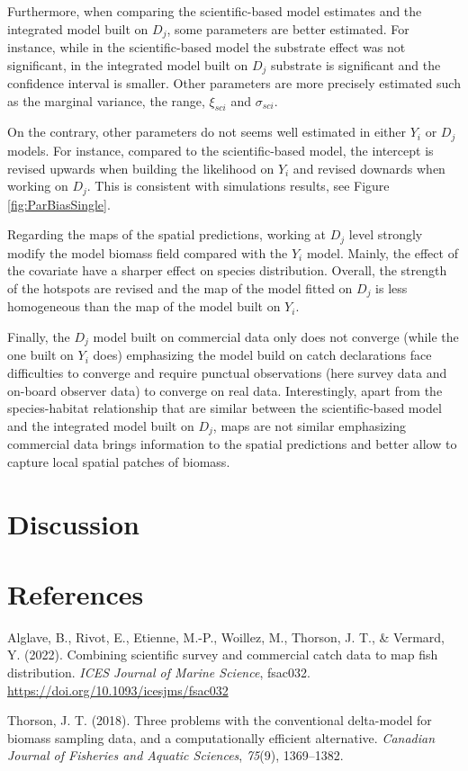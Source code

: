 \documentclass[
  english,
  man]{apa6}
\begin{document}
Furthermore, when comparing the scientific-based model estimates and the integrated model built on \(D_j\), some parameters are better estimated. For instance, while in the scientific-based model the substrate effect was not significant, in the integrated model built on \(D_j\) substrate is significant and the confidence interval is smaller. Other parameters are more precisely estimated such as the marginal variance, the range, \(\xi_{sci}\) and \(\sigma_{sci}\).

On the contrary, other parameters do not seems well estimated in either \(Y_i\) or \(D_j\) models. For instance, compared to the scientific-based model, the intercept is revised upwards when building the likelihood on \(Y_i\) and revised downards when working on \(D_j\). This is consistent with simulations results, see Figure \ref{fig:ParBiasSingle}.

Regarding the maps of the spatial predictions, working at \(D_j\) level strongly modify the model biomass field compared with the \(Y_i\) model. Mainly, the effect of the covariate have a sharper effect on species distribution. Overall, the strength of the hotspots are revised and the map of the model fitted on \(D_j\) is less homogeneous than the map of the model built on \(Y_i\).

Finally, the \(D_j\) model built on commercial data only does not converge (while the one built on \(Y_i\) does) emphasizing the model build on catch declarations face difficulties to converge and require punctual observations (here survey data and on-board observer data) to converge on real data. Interestingly, apart from the species-habitat relationship that are similar between the scientific-based model and the integrated model built on \(D_j\), maps are not similar emphasizing commercial data brings information to the spatial predictions and better allow to capture local spatial patches of biomass.

\hypertarget{discussion}{%
\section{Discussion}\label{discussion}}

\newpage

\hypertarget{references}{%
\section{References}\label{references}}

\begingroup
\setlength{\parindent}{-0.5in}
\setlength{\leftskip}{0.5in}

\hypertarget{refs}{}
\leavevmode\hypertarget{ref-alglave_combining_2022}{}%
Alglave, B., Rivot, E., Etienne, M.-P., Woillez, M., Thorson, J. T., \& Vermard, Y. (2022). Combining scientific survey and commercial catch data to map fish distribution. \emph{ICES Journal of Marine Science}, fsac032. \url{https://doi.org/10.1093/icesjms/fsac032}

\leavevmode\hypertarget{ref-thorson_three_2018}{}%
Thorson, J. T. (2018). Three problems with the conventional delta-model for biomass sampling data, and a computationally efficient alternative. \emph{Canadian Journal of Fisheries and Aquatic Sciences}, \emph{75}(9), 1369--1382.

\endgroup
\end{document}
